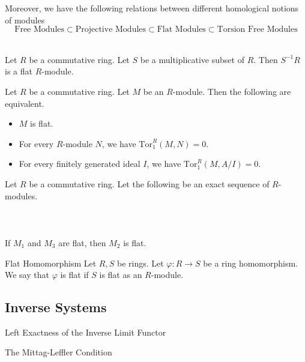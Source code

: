 \documentclass[a4paper]{article}
\begin{document}
Moreover, we have the following relations between different homological notions of modules $$\text{Free Modules}\subset\text{Projective Modules}\subset\text{Flat Modules}\subset\text{Torsion Free Modules}$$

\begin{prp}{}{}\\
Let $R$ be a commutative ring. Let $S$ be a multiplicative subset of $R$. Then $S^{-1}R$ is a flat $R$-module. 
\end{prp}

\begin{prp}{}{} Let $R$ be a commutative ring. Let $M$ be an $R$-module. Then the following are equivalent. 
\begin{itemize}
\item $M$ is flat. 
\item For every $R$-module $N$, we have $\text{Tor}_1^R(M,N)=0$. 
\item For every finitely generated ideal $I$, we have $\text{Tor}_1^R(M,A/I)=0$. 
\end{itemize}
\end{prp}

\begin{prp}{}{} Let $R$ be a commutative ring. Let the following be an exact sequence of $R$-modules. \\~\\
\\~\\
If $M_1$ and $M_3$ are flat, then $M_2$ is flat. 
\end{prp}

\begin{defn}{Flat Homomorphism}{} Let $R,S$ be rings. Let $\varphi:R\to S$ be a ring homomorphism. We say that $\varphi$ is flat if $S$ is flat as an $R$-module. 
\end{defn}

\subsection{Inverse Systems}
\begin{prp}{}{} Left Exactness of the Inverse Limit Functor
\end{prp}

\begin{defn}{The Mittag-Leffler Condition}{}
\end{defn}
\end{document}
